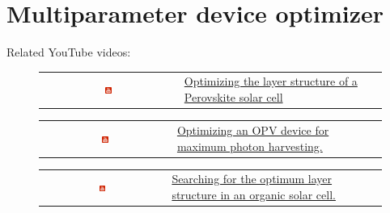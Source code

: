 \pagebreak
\section{Multiparameter device optimizer}
\label{sec:device_optimizer}
Related YouTube videos:

\begin{figure}[H]
\begin{tabular}{ c l }
\includegraphics[width=0.05\textwidth]{./images/youtube.png}
&
\href{https://www.youtube.com/watch?v=L5o0ogp67vE}{Optimizing the layer structure of a Perovskite solar cell}
\end{tabular}
\end{figure}

\begin{figure}[H]
\begin{tabular}{ c l }

\includegraphics[width=0.05\textwidth]{./images/youtube.png}

&
\href{https://www.youtube.com/watch?v=sBhCg9lWjZ8 }{Optimizing an OPV device for maximum photon harvesting.}

\end{tabular}
\end{figure}

\begin{figure}[H]
\begin{tabular}{ c l }

\includegraphics[width=0.05\textwidth]{./images/youtube.png}

&
\href{https://www.youtube.com/watch?v=60RVozhJqFY  }{Searching for the optimum layer structure in an organic solar cell.}

\end{tabular}
\end{figure}

